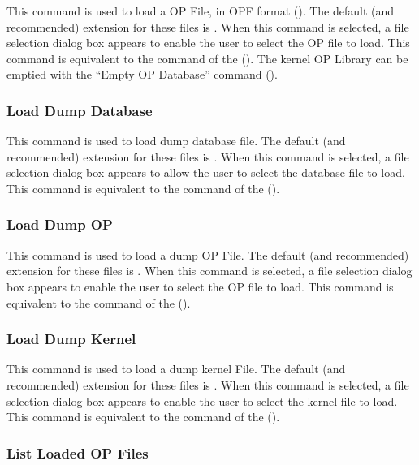 This command is used to load a OP File, in OPF format (). The
default (and recommended) extension for these files is  . When this
command is selected, a file selection dialog box appears to enable the user to
select the OP file to load. This command is equivalent to the
 command of the \CPK{} ().  The kernel OP Library can be emptied with the ``Empty OP
Database'' command ().

\subsubsection{Load Dump Database}

This command is used to load dump database file. The default (and recommended)
extension for these files is . When this command is selected, a file
selection dialog box appears to allow the user to select the database file to
load. This command is equivalent to the  command of the
\CPK{} (). 

\subsubsection{Load Dump OP}

This command is used to load a dump OP File. The default (and recommended)
extension for these files is  . When this command is selected, a
file selection dialog box appears to enable the user to select the OP file to
load. This command is equivalent to the  command of the
\CPK{} ().

\subsubsection{Load Dump Kernel}

This command is used to load a dump kernel File. The default (and recommended)
extension for these files is  . When this command is selected, a
file selection dialog box appears to enable the user to select the kernel file
to load. This command is equivalent to the  command of
the \CPK{} ().

\subsubsection{List Loaded OP Files}

